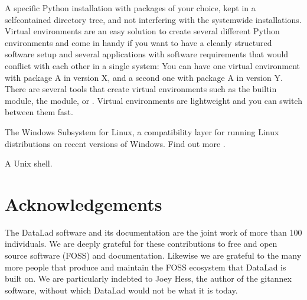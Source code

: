 \begin{description}
\sphinxAtStartPar
A specific Python installation with packages of your choice, kept in a self\sphinxhyphen{}contained directory tree, and not interfering with the system\sphinxhyphen{}wide installations.
Virtual environments are an easy solution to create several different Python environments and come in handy if you want to have a cleanly structured software setup and several applications with software requirements that would conflict with each other in a single system: You can have one virtual environment with package A in version X, and a second one with package A in version Y.
There are several tools that create virtual environments such as the built\sphinxhyphen{}in  module, the  module, or {\hyperref[\detokenize{glossary:term-conda}]{}}.
Virtual environments are light\sphinxhyphen{}weight and you can switch between them fast.

\sphinxAtStartPar
The Windows Subsystem for Linux, a compatibility layer for running Linux distributions on recent versions of Windows. Find out more .

\ignorespaces 
\sphinxAtStartPar
A Unix shell.

\end{description}

\newpage

\sphinxstepscope


\section{Acknowledgements}
\label{\detokenize{acknowledgements:acknowledgements}}\label{\detokenize{acknowledgements::doc}}
\sphinxAtStartPar
The DataLad software and its documentation are the joint work of more than 100 individuals.
We are deeply grateful for these contributions to free and open source software (FOSS) and documentation.
Likewise we are grateful to the many more people that produce and maintain the FOSS ecosystem that DataLad is built on.
We are particularly indebted to Joey Hess, the author of the git\sphinxhyphen{}annex software, without which DataLad would not be what it is today.

